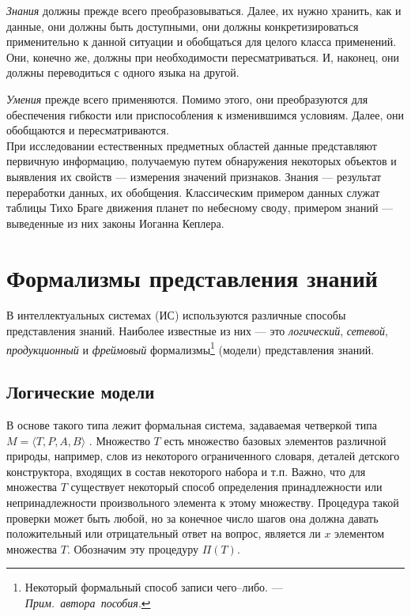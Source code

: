 \documentclass[12pt, openany, twoside]{book} %
\def\AR{{\em Прим.~автора~пособия}}
\begin{document}
    {\em Знания} должны прежде всего преобразовываться. Далее, их нужно хранить, как и данные, они должны быть доступными, они должны конкретизироваться применительно к данной ситуации и обобщаться для целого класса применений. Они, конечно же, должны при необходимости пересматриваться. И, наконец, они должны переводиться с одного языка на другой.

    {\em Умения} прежде всего применяются. Помимо этого, они преобразуются для обеспечения гибкости или приспособления к изменившимся условиям. Далее, они обобщаются и пересматриваются.\\[1ex]

При исследовании естественных предметных областей данные представляют первичную информацию, получаемую путем обнаружения некоторых объектов и выявления их свойств --- измерения значений признаков. Знания --- результат переработки данных, их обобщения. Классическим примером данных служат таблицы Тихо Браге движения планет по небесному своду, примером знаний --- выведенные из них законы Иоганна Кеплера.

\section{Формализмы представления знаний}
\label{sec:knowlege_repr}


В интеллектуальных системах (ИС) используются различные способы представления знаний. Наиболее известные из них --- это {\em логический}, {\em сетевой}, {\em продукционный} и {\em фреймовый} формализмы\footnote{Некоторый формальный способ записи чего--либо. --- \AR.} (модели) представления знаний.

\subsection{Логические модели}

 В основе такого типа лежит формальная система, задаваемая четверкой типа $M=\langle T, P, A, B\rangle$ \cite{AIDictionary}. Множество $T$ есть множество базовых элементов различной природы, например, слов из некоторого ограниченного словаря, деталей детского конструктора, входящих в состав некоторого набора и т.п. Важно, что для множества $T$ существует некоторый способ определения принадлежности или непринадлежности произвольного элемента к этому множеству. Процедура такой проверки может быть любой, но за конечное число шагов она должна давать положительный или отрицательный ответ на вопрос, является ли $x$ элементом множества $T$. Обозначим эту процедуру $\Pi(T)$.
\end{document}
